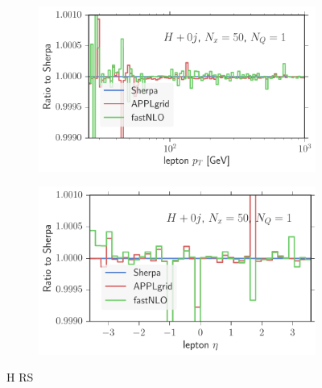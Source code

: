 \begin{figure}
\begin{subfigure}[]{0.49\textwidth}
	\includegraphics[width=\textwidth]{images/hrs_lpt.pdf}
\end{subfigure}
\begin{subfigure}[]{0.49\textwidth}
	\includegraphics[width=\textwidth]{images/hrs_leta.pdf}
\end{subfigure}
\caption{H RS}
\end{figure}
%
